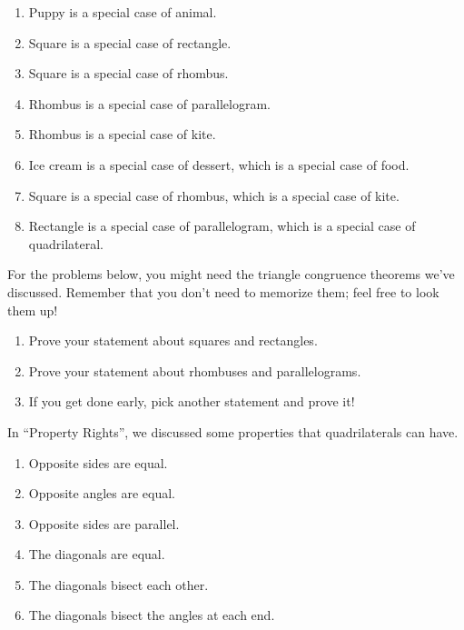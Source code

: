 \documentclass[nooutcomes,noauthor, handout]{ximera}
\begin{document}
\begin{problem}
\begin{solution}
\begin{enumerate}
\item Puppy is a special case of animal.
\item Square is a special case of rectangle.
\item Square is a special case of rhombus.
\item Rhombus is a special case of parallelogram.
\item Rhombus is a special case of kite.
\item Ice cream is a special case of dessert, which is a special case of food.
\item Square is a special case of rhombus, which is a special case of kite.
\item Rectangle is a special case of parallelogram, which is a special case of quadrilateral.
\end{enumerate}
\end{solution}
\end{problem}

For the problems below, you might need the triangle congruence theorems we've discussed. Remember that you don't need to memorize them; feel free to look them up!

\begin{problem}

\begin{enumerate}
	\item Prove your statement about squares and rectangles.
	\item Prove your statement about rhombuses and parallelograms.
	\item If you get done early, pick another statement and prove it!
\end{enumerate}
\end{problem}

\newpage

In ``Property Rights'', we discussed some properties that quadrilaterals can have.
\begin{enumerate}[label= P{\arabic*}.]
    \item Opposite sides are equal.
    \item Opposite angles are equal.
    \item Opposite sides are parallel. %
    \item The diagonals are equal.
    \item The diagonals bisect each other.
    \item The diagonals bisect the angles at each end.
    
\end{enumerate} 
\end{document}
